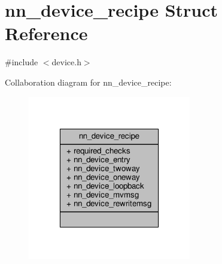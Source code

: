 \hypertarget{structnn__device__recipe}{}\section{nn\+\_\+device\+\_\+recipe Struct Reference}
\label{structnn__device__recipe}


{\ttfamily \#include $<$device.\+h$>$}



Collaboration diagram for nn\+\_\+device\+\_\+recipe\+:\nopagebreak
\begin{figure}[H]
\begin{center}
\leavevmode
\includegraphics[width=202pt]{structnn__device__recipe__coll__graph}
\end{center}
\end{figure}
